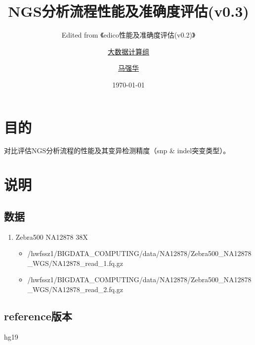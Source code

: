 \documentclass[UTF8,10pt,a4paper]{ctexart}
\title{NGS分析流程性能及准确度评估{\small (v0.3)}}
\subtitle{Edited from 《edico性能及准确度评估{\small (v0.2)}》}
\author{\href{http://bigdata.genomics.cn/}{大数据计算组} \and
\href{mailto:huangzhibo@genomics.cn}{马强华}}
\date{\today}
\begin{document}
\maketitle
\vspace{3em}
\setcounter{tocdepth}{2}
\tableofcontents\thispagestyle{empty}
\newpage
\setlength{\parskip}{1ex plus 0.5ex minus 0.2ex}



\section{目的}
对比评估NGS分析流程的性能及其变异检测精度（snp \& indel突变类型）。

\section{说明}

\subsection{数据}
\begin{enumerate}
\item Zebra500 NA12878 38X
{\footnotesize
\begin{itemize}
\item /hwfssz1/BIGDATA\_COMPUTING/data/NA12878/Zebra500\_NA12878\_WGS/NA12878\_read\_1.fq.gz
\item /hwfssz1/BIGDATA\_COMPUTING/data/NA12878/Zebra500\_NA12878\_WGS/NA12878\_read\_2.fq.gz
\end{itemize}
}
\end{enumerate}

\subsection{reference版本}
hg19
\end{document}
